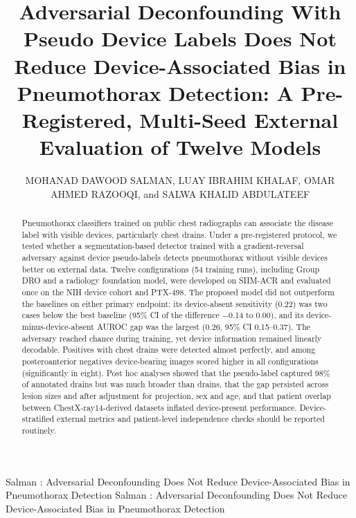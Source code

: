 \documentclass{ieeeaccess}
\begin{document}

\title{Adversarial Deconfounding With Pseudo Device Labels Does Not Reduce Device-Associated Bias in Pneumothorax Detection: A Pre-Registered, Multi-Seed External Evaluation of Twelve Models}
\author{\uppercase{Mohanad Dawood Salman}, \uppercase{Luay Ibrahim Khalaf}, \uppercase{Omar Ahmed Razooqi}, and \uppercase{Salwa Khalid Abdulateef}}
\address[1]{Computer Science Department, College of Computer Science and Mathematics, Tikrit University, Tikrit, Salah al-Deen 34001, Iraq}
\address[2]{Department of Hadith and Its Sciences, College of Islamic Sciences, Tikrit University, Tikrit, Salah al-Deen 34001, Iraq}

\markboth
{Salman \headeretal: Adversarial Deconfounding Does Not Reduce Device-Associated Bias in Pneumothorax Detection}
{Salman \headeretal: Adversarial Deconfounding Does Not Reduce Device-Associated Bias in Pneumothorax Detection}


\begin{abstract}
Pneumothorax classifiers trained on public chest radiographs can associate the disease label with visible devices, particularly chest drains. Under a pre-registered protocol, we tested whether a segmentation-based detector trained with a gradient-reversal adversary against device pseudo-labels detects pneumothorax without visible devices better on external data. Twelve configurations (54 training runs), including Group DRO and a radiology foundation model, were developed on SIIM-ACR and evaluated once on the NIH device cohort and PTX-498. The proposed model did not outperform the baselines on either primary endpoint: its device-absent sensitivity (0.22) was two cases below the best baseline (95\% CI of the difference $-$0.14 to 0.00), and its device-minus-device-absent AUROC gap was the largest (0.26, 95\% CI 0.15--0.37). The adversary reached chance during training, yet device information remained linearly decodable. Positives with chest drains were detected almost perfectly, and among posteroanterior negatives device-bearing images scored higher in all configurations (significantly in eight). Post hoc analyses showed that the pseudo-label captured 98\% of annotated drains but was much broader than drains, that the gap persisted across lesion sizes and after adjustment for projection, sex and age, and that patient overlap between ChestX-ray14-derived datasets inflated device-present performance. Device-stratified external metrics and patient-level independence checks should be reported routinely.
\end{abstract}
\end{document}
